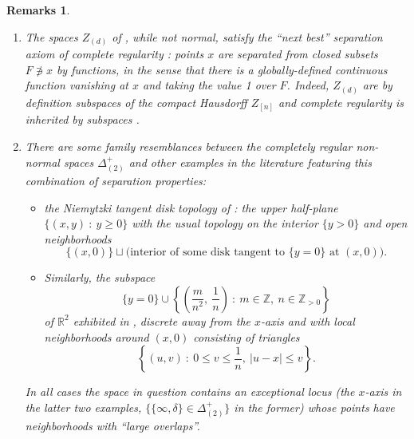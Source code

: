 \documentclass[11pt,leqno]{article}
\theoremstyle{plain}
\theoremstyle{plain}
\theoremstyle{plain}
\newtheorem{remarks}[lemma]{Remarks}
\numberwithin{equation}{section}
\theoremstyle{nonumberplain}
\newcommand\bR{{\mathbb R}}
\newcommand\bZ{{\mathbb Z}}
\newcommand\1{{\bf 1}}
\begin{document}
\begin{remarks}\label{res:same.comb.princ}
  \begin{enumerate}[(1),wide]
    
  \item The spaces $Z_{(d)}$ of , while not normal, satisfy the ``next best'' separation axiom of {\it complete regularity} \cite[Definition 14.8]{wil_top}: points $x$ are separated from closed subsets $F\not\ni x$ by functions, in the sense that there is a globally-defined continuous function vanishing at $x$ and taking the value 1 over $F$. Indeed, $Z_{(d)}$ are by definition subspaces of the compact Hausdorff $Z_{[n]}$ and complete regularity is inherited by subspaces \cite[Theorem 14.10(a)]{wil_top}. 

  \item There are some family resemblances between the completely regular non-normal spaces $\Delta^+_{(2)}$ and other examples in the literature featuring this combination of separation properties:
    \begin{itemize}[wide]
    \item the {\it Niemytzki tangent disk topology} of  \cite[Example 82]{ss_countertop}: the upper half-plane $\{(x,y)\ :\ y\ge 0\}$ with the usual topology on the interior $\{y>0\}$ and open neighborhoods
      \begin{equation*}
        \{(x,0)\}
        \sqcup
        \bigg(\text{interior of some disk tangent to $\{y=0\}$ at $(x,0)$}\bigg). 
      \end{equation*}


    \item Similarly, the subspace 
      \begin{equation*}
        \{y=0\}\cup\left\{\left(\frac {m}{n^2},\ \frac 1{n}\right)\ :\ m\in \bZ,\ n\in \bZ_{>0}\right\}
      \end{equation*}
      of $\bR^2$ exhibited in \cite{MR20769}, discrete away from the $x$-axis and with local neighborhoods around $(x,0)$ consisting of triangles
      \begin{equation*}
        \left\{(u,v)\ :\ 0\le v\le\frac 1n,\ |u-x|\le v\right\}.
      \end{equation*}
    \end{itemize}
    In all cases the space in question contains an exceptional locus (the $x$-axis in the latter two examples, $\{\{\infty,\delta\}\in \Delta^+_{(2)}\}$ in the former) whose points have neighborhoods with ``large overlaps''.     
    

\end{enumerate}
\end{remarks}
\end{document}
